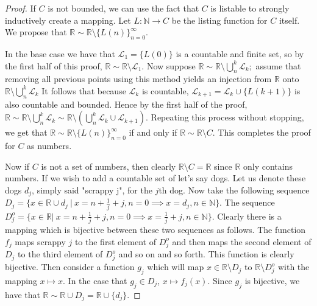\documentclass[letter]{article}
\newenvironment{menumerate}{%
  \edef\backupindent{\the\parindent}%
  \enumerate%
  \setlength{\parindent}{\backupindent}%
}{\endenumerate}
\begin{document}
\begin{menumerate}
\begin{menumerate}
\begin{proof}
 			 		 If $C$ is not bounded, we can use the fact that $C$ is listable to strongly inductively create a mapping. Let $L:\mathbb{N}\to C$ be the listing function for $C$ itself. We propose that $\mathbb{R} \sim \mathbb{R} \setminus \{L(n)\}_{n=0}^\infty$.

 			 		 In the base case we have that $\mathcal{L}_1 = \{L(0)\}$ is a countable and finite set, so by the first half of this proof, $\mathbb{R} \sim \mathbb{R} \setminus \mathcal{L}_1.$ Now suppose $\mathbb{R} \sim \mathbb{R} \setminus \bigcup_n^k \mathcal{L}_k;$ assume that removing all previous points using this method yields an injection from $\mathbb{R}$ onto $\mathbb{R} \setminus \bigcup_n^k \mathcal{L}_k$ It follows that because $\mathcal{L}_k$ is countable, $\mathcal{L}_{k+1} = \mathcal{L}_k \cup \{L(k+1)\}$ is also countable and bounded. Hence by the first half of the proof, $\mathbb{R} \sim \mathbb{R} \setminus \bigcup_n^k \mathcal{L}_k \sim \mathbb{R} \setminus \left( \bigcup_n^k \mathcal{L}_k \cup \mathcal{L}_{k+1} \right).$ Repeating this process without stopping, we get that  $\mathbb{R} \sim \mathbb{R} \setminus \{L(n)\}_{n=0}^\infty$ if and only if  $\mathbb{R} \sim \mathbb{R} \setminus C$. This completes the proof for $C$ as numbers.

					 Now if $C$ is not a set of numbers, then clearly $\mathbb{R} \setminus C = \mathbb{R}$ since $\mathbb{R}$ only contains numbers. If we wish to add a countable set of let's say dogs. Let us denote these dogs $d_j$, simply said "scrappy j", for the $j$th dog. Now take the following sequence $D_j = \{x \in \mathbb{R} \cup {d_j}\ | \ x = n + \frac{1}{j}+j, n =0 \implies x = d_j , n \in \mathbb{N}\}.$  The sequence $D^o_j = \{x \in \mathbb{R} | \ x = n + \frac{1}{j}+j, n =0 \implies x = \frac{1}{j}+j , n \in \mathbb{N}\}.$ Clearly there is a mapping which is bijective  between these two sequences as follows. The function $f_j$ maps scrappy $j$ to the first element of $D^o_j$ and then maps the second element of $D_j$ to the third element of $D^o_j$ and so on and so forth. This function is clearly bijective. Then consider a function $g_j$ which will map $x \in \mathbb{R} \setminus D_j$ to $\mathbb{R} \setminus D_j^o$ with the mapping $x \mapsto x.$ In the case that $g_j \in D_j$, $x \mapsto f_j(x).$ Since $g_j$ is bijective, we have that $\mathbb{R} \sim \mathbb{R} \cup D_j = \mathbb{R} \cup \{d_j\}.$


\end{proof}
\end{menumerate}
\end{menumerate}
\end{document}
